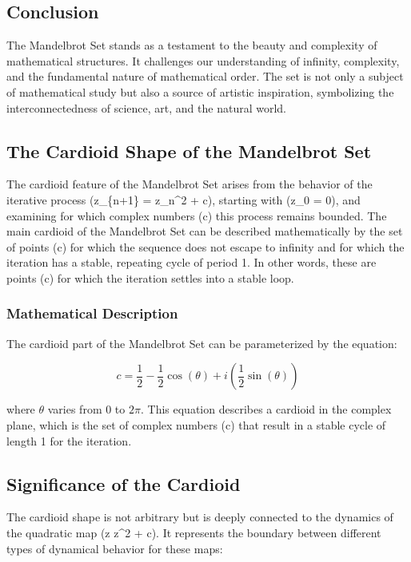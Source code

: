 \documentclass[
]{article}
\begin{document}
\subsection{Conclusion}\label{conclusion-5}

The Mandelbrot Set stands as a testament to the beauty and complexity of
mathematical structures. It challenges our understanding of infinity,
complexity, and the fundamental nature of mathematical order. The set is
not only a subject of mathematical study but also a source of artistic
inspiration, symbolizing the interconnectedness of science, art, and the
natural world.

\subsection{The Cardioid Shape of the Mandelbrot
Set}\label{the-cardioid-shape-of-the-mandelbrot-set}

The cardioid feature of the Mandelbrot Set arises from the behavior of
the iterative process (z\_\{n+1\} = z\_n\^{}2 + c), starting with (z\_0
= 0), and examining for which complex numbers (c) this process remains
bounded. The main cardioid of the Mandelbrot Set can be described
mathematically by the set of points (c) for which the sequence does not
escape to infinity and for which the iteration has a stable, repeating
cycle of period 1. In other words, these are points (c) for which the
iteration settles into a stable loop.

\subsubsection{Mathematical Description}\label{mathematical-description}

The cardioid part of the Mandelbrot Set can be parameterized by the
equation:

\[ c = \frac{1}{2} - \frac{1}{2}\cos(\theta) + i\left(\frac{1}{2}\sin(\theta)\right) \]

where $\theta$ varies from 0 to $2\pi$. This equation describes a
cardioid in the complex plane, which is the set of complex numbers (c)
that result in a stable cycle of length 1 for the iteration.

\subsection{Significance of the
Cardioid}\label{significance-of-the-cardioid}

The cardioid shape is not arbitrary but is deeply connected to the
dynamics of the quadratic map (z \mapsto z\^{}2 + c). It represents the
boundary between different types of dynamical behavior for these maps:
\end{document}
